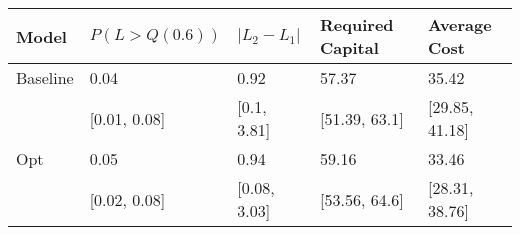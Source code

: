 \begin{tabular}{lllll}
\toprule
   Model & $P(L > Q(0.6))$ & $|L_2 - L_1|$ & Required Capital &   Average Cost \\
\midrule
Baseline &            0.04 &          0.92 &            57.37 &          35.42 \\
         &    [0.01, 0.08] &   [0.1, 3.81] &    [51.39, 63.1] & [29.85, 41.18] \\
     Opt &            0.05 &          0.94 &            59.16 &          33.46 \\
         &    [0.02, 0.08] &  [0.08, 3.03] &    [53.56, 64.6] & [28.31, 38.76] \\
\bottomrule
\end{tabular}
